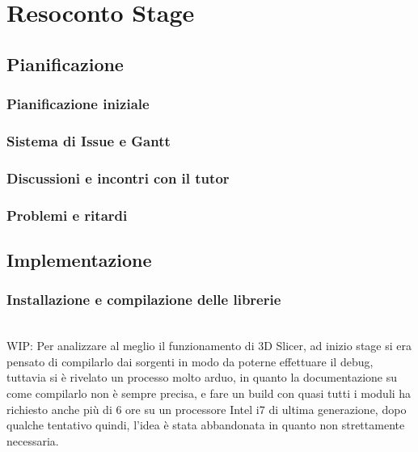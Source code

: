 
\chapter{Resoconto Stage}
\label{cap:resoconto-stage}

\section{Pianificazione}
\subsection{Pianificazione iniziale}

\subsection{Sistema di Issue e Gantt}

\subsection{Discussioni e incontri con il tutor}

\subsection{Problemi e ritardi}

\section{Implementazione}
\subsection{Installazione e compilazione delle librerie}
\\
WIP: Per analizzare al meglio il funzionamento di 3D Slicer, ad inizio stage si era pensato di compilarlo dai sorgenti in modo da poterne effettuare il debug, tuttavia si è rivelato un processo molto arduo, in quanto la documentazione su come compilarlo non è sempre precisa, e fare un build con quasi tutti i moduli ha richiesto anche più di 6 ore su un processore Intel i7 di ultima generazione, dopo qualche tentativo quindi, l'idea è stata abbandonata in quanto non strettamente necessaria.

